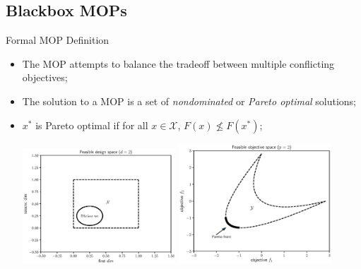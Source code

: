 \documentclass[xcolor=dvipsnames]{beamer}
\begin{document}
\subsection{Blackbox MOPs}
\begin{frame}{Formal MOP Definition}
\begin{itemize}
\item The MOP attempts to balance the tradeoff between multiple conflicting
objectives;
\item The solution to a MOP is a set of {\it nondominated} or
{\it Pareto optimal} solutions;
\item $x^*$ is Pareto optimal if for all $x\in\mathcal{X}$, $F(x) \not\leq F(x^*)$;
\begin{center}
\includegraphics[width=0.45\textwidth]{feasible_design.eps}
\includegraphics[width=0.45\textwidth]{convex_pareto.eps}
\end{center}
\end{itemize}
\end{frame}
\end{document}
